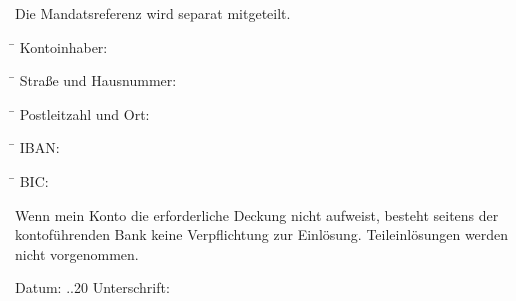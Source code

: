 \documentclass{scrartcl}
\begin{document}
Die Mandatsreferenz wird separat mitgeteilt.
\begin{tabbing}
\hspace*{5cm}\= \hspace*{7cm} \kill
Kontoinhaber: \> \underline{\hspace{335pt}}
\end{tabbing}
\begin{tabbing}
\hspace*{5cm}\= \hspace*{7cm} \kill
Stra{\ss}e und Hausnummer: \> \underline{\hspace{335pt}}
\end{tabbing}
\begin{tabbing}
\hspace*{5cm}\= \hspace*{7cm} \kill
Postleitzahl und Ort: \> \underline{\hspace{335pt}}
\end{tabbing}
\begin{tabbing}
\hspace*{5cm}\= \hspace*{7cm} \kill
IBAN:\enskip\hrulefill \> \underline{\hspace{335pt}}
\end{tabbing}
\begin{tabbing}
\hspace*{5cm}\= \hspace*{7cm} \kill
BIC:\enskip\hrulefill \> \underline{\hspace{335pt}}
\end{tabbing}

\addvspace{0.2cm}

\footnotesize
Wenn mein Konto die erforderliche Deckung nicht aufweist, besteht seitens der
kontof\"uhrenden Bank keine Verpflichtung zur Einl\"osung. Teileinl\"osungen werden nicht
vorgenommen.\\
\normalsize

\addvspace{0.1cm}

Datum: \hspace{2pt} \underline{\hspace{20pt}}.\underline{\hspace{20pt}}.20\underline{\hspace{20pt}} Unterschrift: \hspace{2pt} \underline{\hspace{10cm}} 

\addvspace{0.2cm}
\hfill {}
\end{document}
